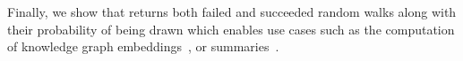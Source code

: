 \noindent Finally, we show that \NAME returns both failed and
succeeded random walks along with their probability of being drawn
which enables use cases such as the computation of knowledge graph
embeddings~\cite{ristoski2016rdf2vec}, or
summaries~\cite{10.1007/978-3-030-49461-2_10}.

